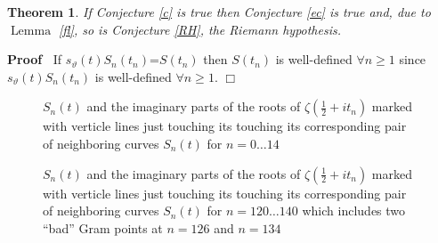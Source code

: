 \documentclass{article}
\newcommand{\tmop}[1]{\ensuremath{\operatorname{#1}}}
\newenvironment{proof}{\noindent\textbf{Proof\ }}{\hspace*{\fill}$\Box$\medskip}
\newtheorem{theorem}{Theorem}
\begin{document}
\begin{theorem}
  If Conjecture \ref{c} is true then Conjecture \ref{ec} is true and, due to
  $\tmop{Lemma}$ \ref{fl}, so is Conjecture \ref{RH}, the Riemann hypothesis.
\end{theorem}

\begin{proof}
  If $s_{\vartheta} (t) S_n (t_n)$=$S (t_n)$ then $S (t_n)$ is well-defined
  $\forall n \geqslant 1$ since $s_{\vartheta} (t) S_n (t_n)$ is well-defined
  $\forall n \geqslant 1$.
\end{proof}

\begin{figure}[h]
  \caption{$S_n (t)$ and the imaginary parts of the roots of $\zeta \left(
  \frac{1}{2} + i t_n \right)$ marked with verticle lines just touching its
  touching its corresponding pair of neighboring curves $S_n (t)$ for $n = 0
  \ldots 14$}
\end{figure}

\begin{figure}[h]
  \caption{$S_n (t)$ and the imaginary parts of the roots of $\zeta \left(
  \frac{1}{2} + i t_n \right)$ marked with verticle lines just touching its
  touching its corresponding pair of neighboring curves $S_n (t)$ for $n = 120
  \ldots 140$ which includes two ``bad'' Gram points at $n = 126$ and $n =
  134$}
\end{figure}
\end{document}
